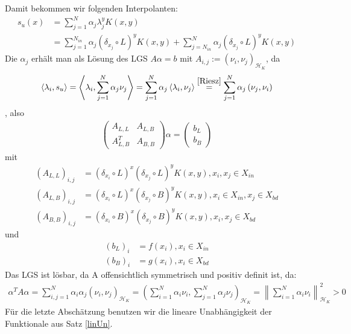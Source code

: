 Damit bekommen wir folgenden Interpolanten:
\begin{align*}
s_u(x) &= \sum_{j=1}^N \alpha_j \lambda_j^y K(x,y)\\
&= \sum_{j=1}^{N_{in}} \alpha_j (\delta_{x_j} \circ L)^y K(x,y) + \sum_{j=N_{in}}^{N} \alpha_j (\delta_{x_j} \circ L)^y K(x,y)
\end{align*}
Die $\alpha_j$ erhält man als Lösung des \ac{LGS} $A \alpha = b$ mit $A_{i,j} := (\nu_i,\nu_j)_{\mathcal{H}_K}$, da
\begin{align*}
\left<\lambda_i, s_u\right> = \left< \lambda_i, \sum_{j=1}^N \alpha_j \nu_j \right> = \sum_{j=1}^N \alpha_j \left< \lambda_i,\nu_j\right> \overset{\ref{Riesz}}{=} \sum_{j=1}^N \alpha_j \left(\nu_j, \nu_i\right)
\end{align*},
 also
\begin{align*}
\begin{pmatrix}
A_{L,L} & A_{L,B} \\ 
A_{L,B}^T & A_{B,B}
\end{pmatrix} 
\alpha =
\begin{pmatrix}
b_L \\ 
b_B
\end{pmatrix} 
\end{align*}
mit
\begin{align*}
(A_{L,L})_{i,j} &= (\delta_{x_i} \circ L)^x(\delta_{x_j} \circ L)^y K(x,y),x_i, x_j \in X_{in}\\
(A_{L,B})_{i,j} &= (\delta_{x_i} \circ L)^x(\delta_{x_j} \circ B)^y K(x,y),x_i \in X_{in}, x_j \in X_{bd} \\
(A_{B,B})_{i,j} &= (\delta_{x_i} \circ B)^x(\delta_{x_j} \circ B)^y K(x,y), x_i, x_j \in X_{bd}
\end{align*}
und
\begin{align*}
(b_L)_i &= f(x_i), x_i \in X_{in}\\
(b_B)_i &= g(x_i), x_i \in X_{bd}
\end{align*}
Das \ac{LGS} ist lösbar, da A offensichtlich symmetrisch und positiv definit ist, da:
\begin{align*}
\alpha^T A \alpha = \sum_{i,j = 1}^N \alpha_i \alpha_j (\nu_i, \nu_j)_{\mathcal{H}_K} = \left(\sum_{i=1}^N \alpha_i \nu_i, \sum_{j=1}^N \alpha_j \nu_j \right)_{\mathcal{H}_K} = \left\| \sum_{i=1}^N \alpha_i \nu_i \right\|_{\mathcal{H}_K}^2 > 0
\end{align*}
Für die letzte Abschätzung benutzen wir die lineare Unabhängigkeit der Funktionale aus Satz \ref{linUn}.
